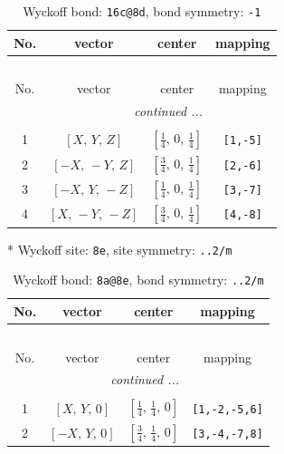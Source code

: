\documentclass[fleqn,8pt]{jsarticle}
\begin{document}
\begin{longtable}{cccc}
\caption{Wyckoff bond: {\tt 16c@8d}, bond symmetry: {\tt -1}}
 \\
 \hline \hline
No. & vector & center & mapping \\ \hline \endfirsthead

\multicolumn{3}{l}{\tablename\ \thetable{}} \\
 \hline \hline
No. & vector & center & mapping \\ \hline \endhead

 \hline \hline
\multicolumn{3}{r}{\footnotesize\it continued ...} \\ \endfoot

 \hline \hline
\multicolumn{3}{r}{} \\ \endlastfoot

1 & $\left[ X,\, Y,\, Z \right]$ & $\left[ \frac{1}{4},\, 0,\, \frac{1}{4} \right]$ & {\tt [1,-5]} \\ \hline
2 & $\left[ - X,\, - Y,\, Z \right]$ & $\left[ \frac{3}{4},\, 0,\, \frac{1}{4} \right]$ & {\tt [2,-6]} \\ \hline
3 & $\left[ - X,\, Y,\, - Z \right]$ & $\left[ \frac{1}{4},\, 0,\, \frac{1}{4} \right]$ & {\tt [3,-7]} \\ \hline
4 & $\left[ X,\, - Y,\, - Z \right]$ & $\left[ \frac{3}{4},\, 0,\, \frac{1}{4} \right]$ & {\tt [4,-8]} \\
\end{longtable}
* Wyckoff site: {\tt 8e}, site symmetry: {\tt ..2/m}
\renewcommand{\arraystretch}{1.2}
\begin{longtable}{cccc}
\caption{Wyckoff bond: {\tt 8a@8e}, bond symmetry: {\tt ..2/m}}
 \\
 \hline \hline
No. & vector & center & mapping \\ \hline \endfirsthead

\multicolumn{3}{l}{\tablename\ \thetable{}} \\
 \hline \hline
No. & vector & center & mapping \\ \hline \endhead

 \hline \hline
\multicolumn{3}{r}{\footnotesize\it continued ...} \\ \endfoot

 \hline \hline
\multicolumn{3}{r}{} \\ \endlastfoot

1 & $\left[ X,\, Y,\, 0 \right]$ & $\left[ \frac{1}{4},\, \frac{1}{4},\, 0 \right]$ & {\tt [1,-2,-5,6]} \\ \hline
2 & $\left[ - X,\, Y,\, 0 \right]$ & $\left[ \frac{3}{4},\, \frac{1}{4},\, 0 \right]$ & {\tt [3,-4,-7,8]} \\
\end{longtable}
\end{document}
